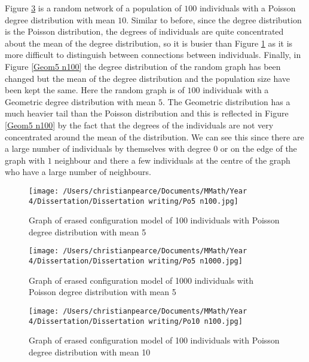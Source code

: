\documentclass{uonmathsreport}
\begin{document}
Figure \ref{Po10 n100} is a random network of a population of $100$ individuals with a Poisson degree distribution with mean $10$. Similar to before, since the degree distribution is the Poisson distribution, the degrees of individuals are quite concentrated about the mean of the degree distribution, so it is busier than Figure \ref{Po5 n100} as it is more difficult to distinguish between connections between individuals. Finally, in Figure \ref{Geom5 n100} the degree distribution of the random graph has been changed but the mean of the degree distribution and the population size have been kept the same. Here the random graph is of $100$ individuals with a Geometric degree distribution with mean $5$. The Geometric distribution has a much heavier tail than the Poisson distribution and this is reflected in Figure \ref{Geom5 n100} by the fact that the degrees of the individuals are not very concentrated around the mean of the distribution.  We can see this since there are a large number of individuals by themselves with degree $0$ or on the edge of the graph with $1$ neighbour and there a few individuals at the centre of the graph who have a large number of neighbours.


\begin{figure}
\begin{center}
\texttt{[image: /Users/christianpearce/Documents/MMath/Year 4/Dissertation/Dissertation writing/Po5 n100.jpg]}
\end{center}
\caption{Graph of erased configuration model of 100 individuals with Poisson degree distribution with mean 5}
\label{Po5 n100}
\end{figure}

\begin{figure}
\begin{center}
\texttt{[image: /Users/christianpearce/Documents/MMath/Year 4/Dissertation/Dissertation writing/Po5 n1000.jpg]}
\end{center}
\caption{Graph of erased configuration model of 1000 individuals with Poisson degree distribution with mean 5}
\label{Po5 n1000}
\end{figure}

\begin{figure}
\begin{center}
\texttt{[image: /Users/christianpearce/Documents/MMath/Year 4/Dissertation/Dissertation writing/Po10 n100.jpg]}
\end{center}
\caption{Graph of erased configuration model of 100 individuals with Poisson degree distribution with mean 10}
\label{Po10 n100}
\end{figure}
\end{document}

